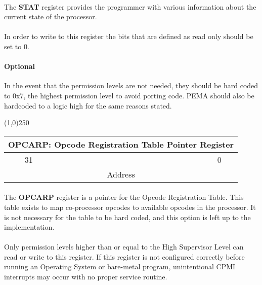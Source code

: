 \documentclass[letterpaper, 11pt]{article}
\begin{document}
\paragraph{} The \textbf{STAT} register provides the programmer with various information about the current state of the processor.
\paragraph{} In order to write to this register the bits that are defined as read only should be set to 0.  \\
\paragraph{Optional} In the event that the permission levels are not needed, they should be hard coded to 0x7, the
highest permission level to avoid porting code. PEMA should also be hardcoded to a logic high for the same reasons stated.\\

\begin{center}
	\line(1,0){250}
\end{center}
\vspace{0.2 cm}

\clearpage

\begin{center}
	\begin{tabular}{|cccccccc|}
		\multicolumn{8}{c}{\textbf{OPCARP}: Opcode Registration Table Pointer  Register} \\ \hline
		31\hfill & \hfill  & \hfill & \hfill & \hfill & \hfill & \hfill &\hfill	0 \\ \hline
		\multicolumn{8}{|c|}{Address}   \\ \hline

	\end{tabular}
\end{center}

\paragraph{} The \textbf{OPCARP} register is a pointer for the Opcode Registration Table.
This table exists to map co-processor opcodes to available opcodes in the processor.
It is not necessary for the table to be hard coded, and this option is left up
to the implementation.
\paragraph{} Only permission levels higher than or equal to the High Supervisor Level
can read or write to this register. If this register is not configured correctly
before running an Operating System or bare-metal program, unintentional CPMI interrupts
may occur with no proper service routine.
\end{document}
